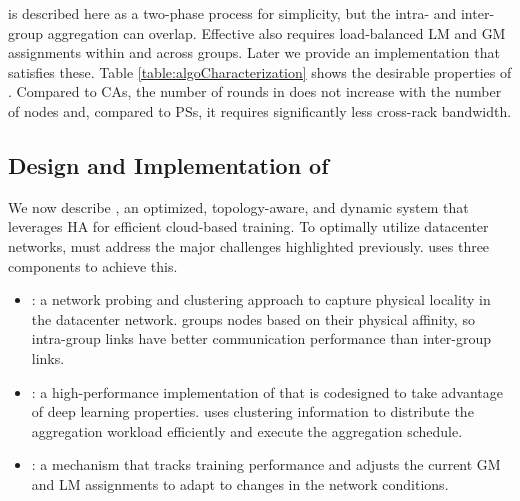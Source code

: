 

\mlha is described here as a two-phase process for simplicity, but the intra- and inter-group aggregation can overlap. Effective \mlha also requires load-balanced LM and GM assignments within and across groups. Later we provide an implementation that satisfies these. Table \ref{table:algoCharacterization} shows the desirable properties of \mlha. Compared to CAs, the number of rounds in \mlha does not increase with the number of nodes and, compared to PSs, it requires significantly less cross-rack bandwidth.

\subsection{Design and Implementation of \plink}

We now describe \plink, an optimized, topology-aware, and dynamic system that leverages HA for efficient cloud-based training. To optimally utilize datacenter networks, \plink must address the major challenges highlighted previously. \plink uses three components to achieve this.
\begin{itemize}[noitemsep,topsep=0pt,parsep=0pt,partopsep=0pt,leftmargin=1em]
    \item \marcopolo: a network probing and clustering approach to capture physical locality in the datacenter network. \marcopolo groups nodes based on their physical affinity, so intra-group links have better communication performance than inter-group links. %
    \item \ha: a high-performance implementation of \mlha that is codesigned to take advantage of deep learning properties. %
    \ha uses clustering information to  distribute the aggregation workload efficiently and execute the aggregation schedule.
    \item \autoplink: a mechanism that tracks training performance and adjusts the current GM and LM assignments to adapt to changes in the network conditions.
\end{itemize}

